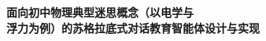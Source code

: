 \documentclass[degree=master]{bnuthesis}
\begin{document}
\thispagestyle{empty}
\null\vfill
\begin{center}
  \Huge\bfseries\heiti
  面向初中物理典型迷思概念（以电学与\\[0.5em]
  浮力为例）的苏格拉底式对话教育智能体设计与实现
\end{center}
\vfill
\clearpage
\restoregeometry

\frontmatter

\tableofcontents



\mainmatter








\backmatter

\end{document}
